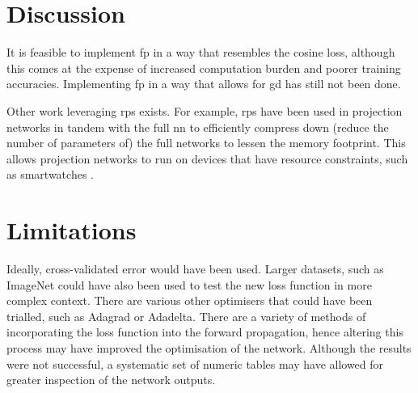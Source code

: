 \section{Discussion}

It is feasible to implement \gls{fp} in a way that resembles the cosine loss, although this comes at the expense of increased computation burden and poorer training accuracies. Implementing \gls{fp} in a way that allows for \gls{gd} has still not been done.
\bigskip

Other work leveraging \gls{rp}s exists. For example, \gls{rp}s have been used in projection networks in tandem with the full \gls{nn} to efficiently compress down (reduce the number of parameters of) the full networks to lessen the memory footprint. This allows projection networks to run on devices that have resource constraints, such as smartwatches \cite{projection_net}. 
\bigskip

\section{Limitations}

Ideally, cross-validated error would have been used. Larger datasets, such as ImageNet could have also been used to test the new loss function in more complex context. There are various other optimisers that could have been trialled, such as Adagrad or Adadelta. There are a variety of methods of incorporating the loss function into the forward propagation, hence altering this process may have improved the optimisation of the network. Although the results were not successful, a systematic set of numeric tables may have allowed for greater inspection of the network outputs.